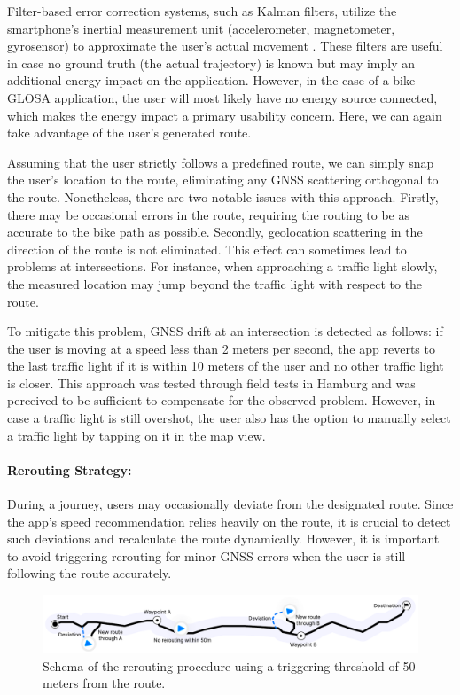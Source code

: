 Filter-based error correction systems, such as Kalman filters, utilize the smartphone's inertial measurement unit (accelerometer, magnetometer, gyrosensor) to approximate the user's actual movement \cite{US20200049837A1}. These filters are useful in case no ground truth (the actual trajectory) is known but may imply an additional energy impact on the application. However, in the case of a bike-GLOSA application, the user will most likely have no energy source connected, which makes the energy impact a primary usability concern. Here, we can again take advantage of the user's generated route.

Assuming that the user strictly follows a predefined route, we can simply snap the user's location to the route, eliminating any GNSS scattering orthogonal to the route. Nonetheless, there are two notable issues with this approach. Firstly, there may be occasional errors in the route, requiring the routing to be as accurate to the bike path as possible. Secondly, geolocation scattering in the direction of the route is not eliminated. This effect can sometimes lead to problems at intersections. For instance, when approaching a traffic light slowly, the measured location may jump beyond the traffic light with respect to the route. 

To mitigate this problem, GNSS drift at an intersection is detected as follows: if the user is moving at a speed less than 2 meters per second, the app reverts to the last traffic light if it is within 10 meters of the user and no other traffic light is closer. This approach was tested through field tests in Hamburg and was perceived to be sufficient to compensate for the observed problem. However, in case a traffic light is still overshot, the user also has the option to manually select a traffic light by tapping on it in the map view.

\paragraph{Rerouting Strategy:} During a journey, users may occasionally deviate from the designated route. Since the app's speed recommendation relies heavily on the route, it is crucial to detect such deviations and recalculate the route dynamically. However, it is important to avoid triggering rerouting for minor GNSS errors when the user is still following the route accurately.

\begin{figure}[htbp]
\centering
\includegraphics[width=\linewidth]{images/rerouting-strategy.pdf}
\caption{Schema of the rerouting procedure using a triggering threshold of 50 meters from the route.}
\label{fig:rerouting-strategy}
\end{figure}

